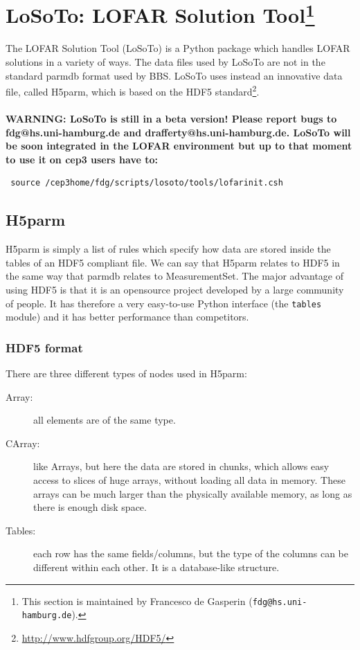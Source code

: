 \documentclass[]{article}
\begin{document}

\def \losoto {LoSoTo}

\section[LoSoTo: LOFAR Solution Tool]{\losoto: LOFAR Solution Tool\footnote{This section is maintained by Francesco de Gasperin ({\tt fdg@hs.uni-hamburg.de}).}}
\label{losoto}

The LOFAR Solution Tool (\losoto{}) is a Python package which handles LOFAR solutions in a variety of ways. The data files used by \losoto{} are not in the standard parmdb format used by BBS. \losoto{} uses instead an innovative data file, called H5parm, which is based on the HDF5 standard\footnote{\url{http://www.hdfgroup.org/HDF5/}}.
\\
\\
\textbf{WARNING: \losoto{} is still in a beta version! Please report bugs to fdg@hs.uni-hamburg.de and drafferty@hs.uni-hamburg.de. \losoto{} will be soon integrated in the LOFAR environment but up to that moment to use it on cep3 users have to:}
\begin{verbatim}
 source /cep3home/fdg/scripts/losoto/tools/lofarinit.csh
\end{verbatim}

\subsection{H5parm}
\label{losoto:h5parm}

H5parm is simply a list of rules which specify how data are stored inside the tables of an HDF5 compliant file. We can say that H5parm relates to HDF5 in the same way that parmdb relates to MeasurementSet. The major advantage of using HDF5 is that it is an opensource project developed by a large community of people. It has therefore a very easy-to-use Python interface (the \texttt{tables} module) and it has better performance than competitors.

\subsubsection{HDF5 format}
\label{losoto:HDF5}

There are three different types of nodes used in H5parm:
\begin{description}
 \item[Array:] all elements are of the same type.
 \item[CArray:] like Arrays, but here the data are stored in chunks, which allows easy access to
slices of huge arrays, without loading all data in memory. These arrays can be much
larger than the physically available memory, as long as there is enough disk space.
 \item[Tables:] each row has the same fields/columns, but the type of the columns can be different within each other. It is a database-like structure.
\end{description}
\end{document}
